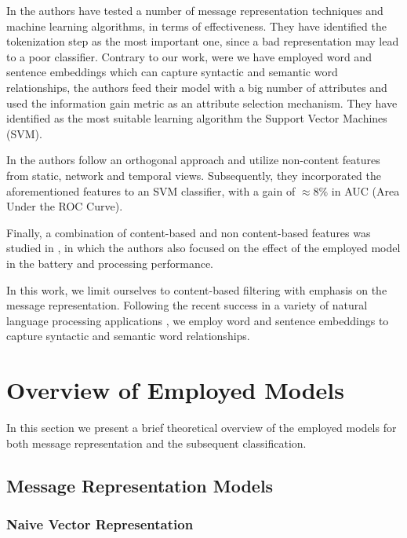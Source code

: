 \documentclass[letterpaper]{article}
\begin{document}
In \cite{gomez2006content} the authors have tested a number of message representation techniques and machine learning algorithms, in terms of effectiveness. They have identified the tokenization step as the most important one, since a bad representation may lead to a poor classifier. Contrary to our work, were we have employed word and sentence embeddings which can capture syntactic and semantic word relationships, the authors feed their model with a big number of attributes and used the information gain metric \cite{yang1999evaluation} as an attribute selection mechanism. They have identified as the most suitable learning algorithm the Support Vector Machines (SVM).

In \cite{6133257} the authors follow an orthogonal approach and utilize non-content features from static, network and temporal views. Subsequently, they incorporated the aforementioned features to an SVM classifier, with a gain of $\approx 8\%$ in AUC (Area Under the ROC Curve).

Finally, a combination of content-based and non content-based features was studied in \cite{sulaiman2016new}, in which the authors also focused on the effect of the employed model in the battery and processing performance.

In this work, we limit ourselves to content-based filtering with emphasis on the message representation. Following the recent success in a variety of natural language processing applications \cite{mikolov2013distributed} \cite{bojanowski2016enriching} \cite{pagliardini2017unsupervised}, we employ word and sentence embeddings to capture syntactic and semantic word relationships.

\section{Overview of Employed Models} \label{Overview}

In this section we present a brief theoretical overview of the employed models for both message representation and the subsequent classification.

\subsection{Message Representation Models}  \label{Representation}

\subsubsection{Naive Vector Representation}  \label{Naive Vector Representation}
\end{document}
